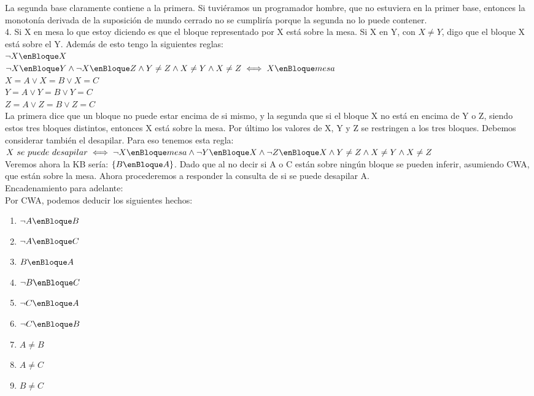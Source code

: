 La segunda base claramente contiene a la primera. Si tuviéramos un programador hombre, que no estuviera en la primer base, entonces la monotonía derivada de la suposición de mundo cerrado no se cumpliría porque la segunda no lo puede contener.\\

4. Si X en mesa lo que estoy diciendo es que el bloque representado por X está sobre la mesa. Si X en Y, con $X \neq Y$, digo que el bloque X está sobre el Y. Además de esto tengo la siguientes reglas: \\

$\neg X \enBloque X$ \\

$\neg X \enBloque Y \wedge \neg X \enBloque Z \wedge Y \neq Z \wedge X \neq Y \wedge X \neq Z \iff X \enBloque mesa$ \\

$X = A \lor X = B \lor X = C$ \\

$Y = A \lor Y = B \lor Y = C$ \\

$Z = A \lor Z = B \lor Z = C$ \\

La primera dice que un bloque no puede estar encima de si mismo, y la segunda que si el bloque X no está en encima de Y o Z, siendo estos tres bloques distintos, entonces X está sobre la mesa. Por último los valores de X, Y y Z se restringen a los tres bloques. Debemos considerar también el desapilar. Para eso tenemos esta regla:\\

$X\ se\ puede\ desapilar \iff \neg X \enBloque mesa \wedge \neg Y \enBloque X \wedge \neg Z \enBloque X \wedge Y \neq Z \wedge X \neq Y \wedge X \neq Z$ \\

Veremos ahora la KB sería: $\{B \enBloque A\}$. Dado que al no decir si A o C están sobre ningún bloque se pueden inferir, asumiendo CWA, que están sobre la mesa. Ahora procederemos a responder la consulta de si se puede desapilar A. \\

Encadenamiento para adelante: \\

Por CWA, podemos deducir los siguientes hechos:\\

\begin{enumerate}
	\item $\neg A \enBloque B$
	\item $\neg A \enBloque C$
	\item $B \enBloque A$
	\item $\neg B \enBloque C$
	\item $\neg C \enBloque A$
	\item $\neg C \enBloque B$
	\item $A \neq B$
	\item $A \neq C$
	\item $B \neq C$
\end{enumerate}


